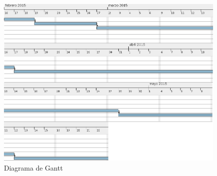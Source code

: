 
\begin{figure}[!ht]
  \begin{center}
    \includegraphics[width=1\textwidth]{../images/diagrama_gantt.png}
    \caption{Diagrama de Gantt}
    \label{fig:diag_edt}
  \end{center}
\end{figure}
